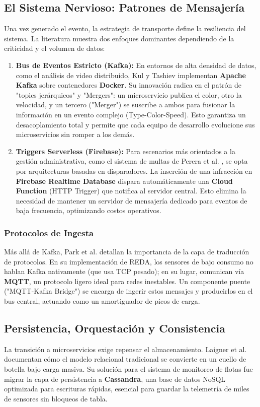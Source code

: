 \subsection{El Sistema Nervioso: Patrones de Mensajería}
Una vez generado el evento, la estrategia de transporte define la resiliencia del sistema. La literatura muestra dos enfoques dominantes dependiendo de la criticidad y el volumen de datos:

\begin{enumerate}
    \item \textbf{Bus de Eventos Estricto (Kafka):} En entornos de alta densidad de datos, como el análisis de video distribuido, Kul y Tashiev \cite{kul2021microservices} implementan \textbf{Apache Kafka} sobre contenedores \textbf{Docker}. Su innovación radica en el patrón de "topics jerárquicos" y "Mergers": un microservicio publica el color, otro la velocidad, y un tercero ("Merger") se suscribe a ambos para fusionar la información en un evento complejo (Type-Color-Speed). Esto garantiza un desacoplamiento total y permite que cada equipo de desarrollo evolucione sus microservicios sin romper a los demás.
    \item \textbf{Triggers Serverless (Firebase):} Para escenarios más orientados a la gestión administrativa, como el sistema de multas de Perera et al. \cite{perera2024traffic}, se opta por arquitecturas basadas en disparadores. La inserción de una infracción en \textbf{Firebase Realtime Database} dispara automáticamente una \textbf{Cloud Function} (HTTP Trigger) que notifica al servidor central. Esto elimina la necesidad de mantener un servidor de mensajería dedicado para eventos de baja frecuencia, optimizando costos operativos.
\end{enumerate}

\subsubsection{Protocolos de Ingesta}
Más allá de Kafka, Park et al. \cite{park2021cloud} detallan la importancia de la capa de traducción de protocolos. En su implementación de REDA, los sensores de bajo consumo no hablan Kafka nativamente (que usa TCP pesado); en su lugar, comunican vía \textbf{MQTT}, un protocolo ligero ideal para redes inestables. Un componente puente ("MQTT-Kafka Bridge") se encarga de ingerir estos mensajes y producirlos en el bus central, actuando como un amortiguador de picos de carga.

\subsection{Persistencia, Orquestación y Consistencia}
La transición a microservicios exige repensar el almacenamiento. Laigner et al. \cite{laigner2020monolithic} documentan cómo el modelo relacional tradicional se convierte en un cuello de botella bajo carga masiva. Su solución para el sistema de monitoreo de flotas fue migrar la capa de persistencia a \textbf{Cassandra}, una base de datos NoSQL optimizada para escrituras rápidas, esencial para guardar la telemetría de miles de sensores sin bloqueos de tabla.

